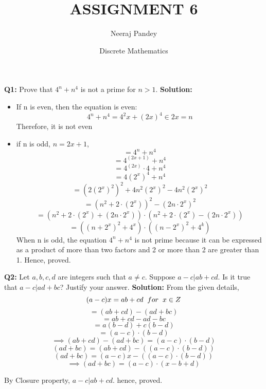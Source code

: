 \documentclass{article}
\title{ASSIGNMENT 6}
\author{Neeraj Pandey}
\date{Discrete Mathematics}
\begin{document}
\maketitle
\begin{flushleft}
\textbf{Q1: } Prove that $4^n + n^4$ is not a prime for $n > 1$.
\newline
\newline
\textbf{Solution: } \begin{itemize}

    \item If n is even, then the equation is even: \[4^n + n^4 = 4^2x + (2x)^ 4 \in 2x = n \]
        Therefore, it is not even
    \item if n is odd, $n = 2x + 1$,
    \[= 4^n + n^4\]
    \[= 4^{(2x +1)} + n^4\]
    \[= 4^{(2x)}\cdot4 + n^4\]
    \[= 4{(2^x)}^{4} + n^4 \]
    \[= {(2{(2^x)}^2)^2} + {4n^{2}{(2^x)}^2} - {4n^2{(2^x)}^2}\]
    \[= {(n^2 + 2 \cdot {(2^x)})^2} - {(2n \cdot 2^x)^2}\]
    \[= {(n^2 + 2 \cdot {(2^x)} + (2n \cdot 2^x)) } \cdot {(n^2 + 2 \cdot {(2^x)} - (2n \cdot 2^x)) }\]
    \[= {((n + 2^x)^2 + 4^x) \cdot ((n - 2^x)^2 + 4^k)}\]
    When n is odd, the equation $4^n + n^4$ is not prime because it can be expressed as a product of more than two factors and 2 or more than 2 are greater than 1.
    \newline
    Hence, proved.

\end{itemize}

\end{flushleft}



\begin{flushleft}
\textbf{Q2: } Let $a, b, c, d$ are integers such that $a \neq c$. Suppose $a - c | ab + c d$. Is it true that $a − c | ad + b c$? Justify your answer.
\newline
\newline
\newcommand\tab[1][1cm]{\hspace*{#1}}
\textbf{Solution: } From the given details, \[(a - c)x = ab + c d \tab[0.2cm]for\tab[0.2cm] x\in Z  \]
\[= (a b + c d) - (a d + b c)\]
\[= a b + c d - a d - b c  \]
\[= a(b - d) + c(b - d)\]
\[= (a - c)\cdot(b - d)\]
\[\implies (a b + c d) - (a d + b c) =  (a - c)\cdot(b - d)\]
\[(a d + b c) =  (a b +  c d) - ((a - c)\cdot(b - d))\]
\[(a d + b c) =  (a - c)x - ((a - c)\cdot(b - d))\]
\[\implies (a d + b c) = (a - c)\cdot(x - b + d) \]

By Closure property, $a - c | ab + c d$.
hence, proved.



\end{flushleft}
\end{document}
